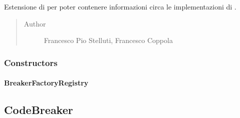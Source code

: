 \documentclass[letterpaper,10pt,italian]{sphinxmanual}
\begin{document}
\begin{fulllineitems}
\label{\detokenize{source/it/unicam/cs/pa/mastermind/players/BreakerFactoryRegistry:it.unicam.cs.pa.mastermind.players.BreakerFactoryRegistry}}
Estensione di  per poter contenere informazioni circa le implementazioni di .
\begin{quote}\begin{description}
\item[{Author}] \leavevmode
Francesco Pio Stelluti, Francesco Coppola

\end{description}\end{quote}

\end{fulllineitems}



\subsubsection{Constructors}
\label{\detokenize{source/it/unicam/cs/pa/mastermind/players/BreakerFactoryRegistry:constructors}}

\paragraph{BreakerFactoryRegistry}
\label{\detokenize{source/it/unicam/cs/pa/mastermind/players/BreakerFactoryRegistry:id1}}

\begin{fulllineitems}
\label{\detokenize{source/it/unicam/cs/pa/mastermind/players/BreakerFactoryRegistry:it.unicam.cs.pa.mastermind.players.BreakerFactoryRegistry.BreakerFactoryRegistry(String)}}
\end{fulllineitems}



\subsection{CodeBreaker}
\label{\detokenize{source/it/unicam/cs/pa/mastermind/players/CodeBreaker:codebreaker}}\label{\detokenize{source/it/unicam/cs/pa/mastermind/players/CodeBreaker::doc}}
\end{document}
